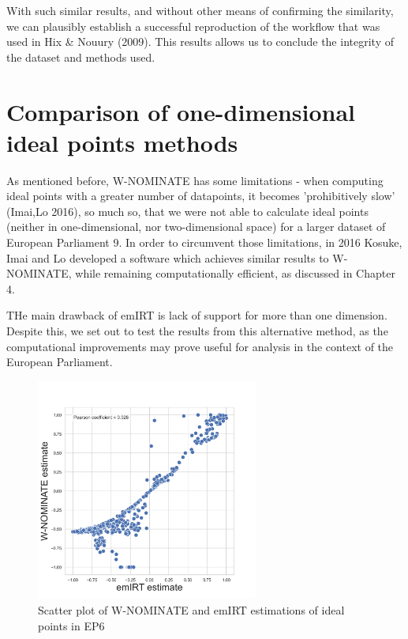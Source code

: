 \documentclass[a4paper,12pt]{report}
\begin{document}
                With such similar results, and without other means of confirming the similarity, we can plausibly
                establish a successful reproduction of the workflow that was used in Hix & Nouury (2009). This
                results allows us to conclude the integrity of the dataset and methods used.


        \section{Comparison of one-dimensional ideal points methods}
            \label{sec:comparison-of-one-dimensional-ideal-points-methods}
            As mentioned before, W-NOMINATE has some limitations - when computing ideal points with a greater number
            of datapoints, it becomes 'prohibitively slow' (Imai,Lo 2016), so much so, that we were not able to
            calculate ideal points (neither in one-dimensional, nor two-dimensional space) for a larger dataset of
            European Parliament 9. In order to circumvent those limitations,
            in 2016 Kosuke, Imai and Lo developed a software which achieves similar results to W-NOMINATE, while
            remaining computationally efficient, as discussed in Chapter 4.

            THe main drawback of emIRT is lack of support for more than one dimension. Despite this, we set out to
            test the results from this alternative method, as the computational improvements may prove useful for
            analysis
            in the context of the European Parliament.
            \begin{figure}[H]
                \centering
                \includegraphics[width=0.65\textwidth]{Graphs/ScatterWNOMINATE_6}
                \caption{Scatter plot of W-NOMINATE and emIRT estimations of ideal points in EP6}
                \label{fig:WNOMINATE_SCATTER_6}
            \end{figure}
\end{document}
